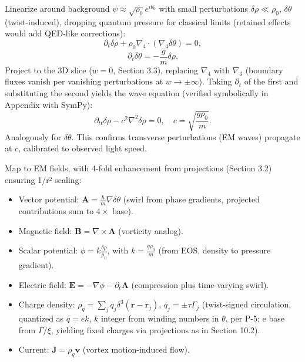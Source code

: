 \documentclass{article}
\begin{document}
Linearize around background \(\psi \approx \sqrt{\rho_0} e^{i \theta_0}\) with small perturbations \(\delta \rho \ll \rho_0\), \(\delta \theta\) (twist-induced), dropping quantum pressure for classical limits (retained effects would add QED-like corrections):
\[
\partial_t \delta \rho + \rho_0 \nabla_4 \cdot (\nabla_4 \delta \theta) = 0,
\]
\[
\partial_t \delta \theta = -\frac{g}{m} \delta \rho.
\]
Project to the 3D slice (\(w=0\), Section 3.3), replacing \(\nabla_4\) with \(\nabla_3\) (boundary fluxes vanish per vanishing perturbations at \(w \to \pm \infty\)). Taking \(\partial_t\) of the first and substituting the second yields the wave equation (verified symbolically in Appendix with SymPy):
\[
\partial_{tt} \delta \rho - c^2 \nabla^2 \delta \rho = 0, \quad c = \sqrt{\frac{g \rho_0}{m}}.
\]
Analogously for \(\delta \theta\). This confirms transverse perturbations (EM waves) propagate at \(c\), calibrated to observed light speed.

Map to EM fields, with 4-fold enhancement from projections (Section 3.2) ensuring 1/r² scaling:
\begin{itemize}
  \item Vector potential: \(\mathbf{A} = \frac{\hbar}{m} \nabla \delta \theta\) (swirl from phase gradients, projected contributions sum to \(4 \times\) base).
  \item Magnetic field: \(\mathbf{B} = \nabla \times \mathbf{A}\) (vorticity analog).
  \item Scalar potential: \(\phi = k \frac{\delta \rho}{\rho_0}\), with \(k = \frac{g \rho_0}{m}\) (from EOS, density to pressure gradient).
  \item Electric field: \(\mathbf{E} = -\nabla \phi - \partial_t \mathbf{A}\) (compression plus time-varying swirl).
  \item Charge density: \(\rho_q = \sum_j q_j \delta^3(\mathbf{r} - \mathbf{r}_j)\), \(q_j = \pm \tau \Gamma_j\) (twist-signed circulation, quantized as \(q = e k\), \(k\) integer from winding numbers in \(\theta\), per P-5; e base from \(\Gamma / \xi\), yielding fixed charges via projections as in Section 10.2).
  \item Current: \(\mathbf{J} = \rho_q \mathbf{v}\) (vortex motion-induced flow).
\end{itemize}
\end{document}
